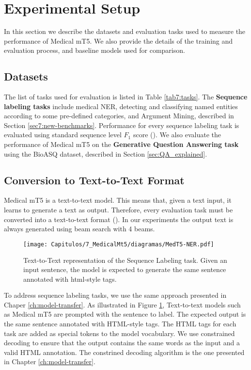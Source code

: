 \section{Experimental Setup}

In this section we describe the datasets and evaluation tasks used to measure the performance of Medical mT5. We also provide the details of the training and evaluation process, and baseline models used for comparison.

\subsection{Datasets}



The list of tasks used for evaluation is listed in Table \ref{tab7:tasks}. The \textbf{Sequence labeling tasks} include medical NER, detecting and classifying named entities according to some pre-defined categories, and Argument Mining, described in Section \ref{sec7:new-benchmarks}. Performance for every sequence labeling task is evaluated using standard sequence level $F_1$ score (\cite{DBLP:conf/conll/SangM03}). 
We also evaluate the performance of Medical mT5 on the \textbf{Generative Question Answering task} using the BioASQ dataset, described in Section \ref{sec:QA_explained}. 

\subsection{Conversion to Text-to-Text Format}

Medical mT5 is a text-to-text model. This means that, given a text input, it learns to generate a text as output. Therefore, every evaluation task must be converted into a text-to-text format (\cite{mt5}). In our experiments the output text is always generated using beam search with 4 beams. 


\begin{figure}[htbp]
  \centering
  \texttt{[image: Capitulos/7\_MedicalMt5/diagramas/MedT5-NER.pdf]}
  \caption{Text-to-Text representation of the Sequence Labeling task. Given an input sentence, the model is expected to generate the same sentence annotated with html-style tags.}
  \label{fig7:SL}
\end{figure}


To address sequence labeling tasks, we use the same approach presented in Chaper \ref{ch:model-transfer}. As illustrated in Figure \ref{fig7:SL}, Text-to-text models such as Medical mT5 are prompted with the sentence to label. The expected output is the same sentence annotated with HTML-style tags. The HTML tags for each task are added as special tokens to the model vocabulary. We use constrained decoding to ensure that the output contains the same words as the input and a valid HTML annotation. The constrined decoding algorithm is the one presented in Chapter \ref{ch:model-transfer}.


